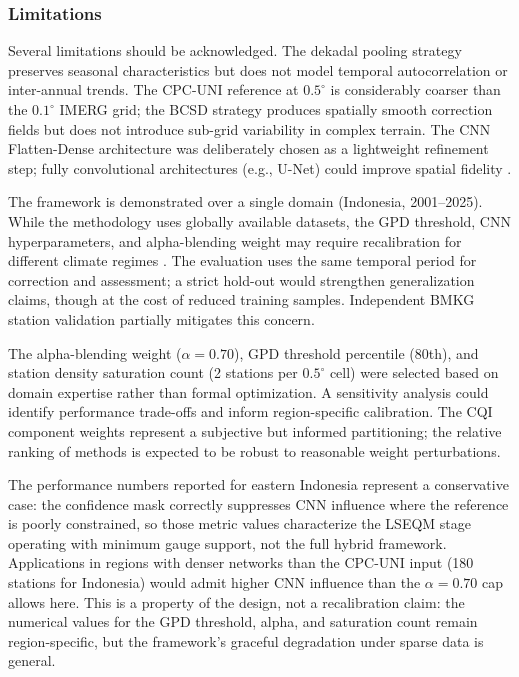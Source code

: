 \documentclass[11pt,a4paper]{article}
\begin{document}
\subsubsection{Limitations}\label{limitations}

Several limitations should be acknowledged. The dekadal pooling strategy preserves seasonal characteristics but does not model temporal autocorrelation or inter-annual trends. The CPC-UNI reference at \(0.5^{\circ}\) is considerably coarser than the \(0.1^{\circ}\) IMERG grid; the BCSD strategy produces spatially smooth correction fields but does not introduce sub-grid variability in complex terrain. The CNN Flatten-Dense architecture was deliberately chosen as a lightweight refinement step; fully convolutional architectures (e.g., U-Net) could improve spatial fidelity \cite{ref40,ref41}.

The framework is demonstrated over a single domain (Indonesia, 2001--2025). While the methodology uses globally available datasets, the GPD threshold, CNN hyperparameters, and alpha-blending weight may require recalibration for different climate regimes \cite{ref44,ref45}. The evaluation uses the same temporal period for correction and assessment; a strict hold-out would strengthen generalization claims, though at the cost of reduced training samples. Independent BMKG station validation partially mitigates this concern.

The alpha-blending weight (\(\alpha = 0.70\)), GPD threshold percentile (80th), and station density saturation count (2 stations per \(0.5^{\circ}\) cell) were selected based on domain expertise rather than formal optimization. A sensitivity analysis could identify performance trade-offs and inform region-specific calibration. The CQI component weights represent a subjective but informed partitioning; the relative ranking of methods is expected to be robust to reasonable weight perturbations.

The performance numbers reported for eastern Indonesia represent a conservative case: the confidence mask correctly suppresses CNN influence where the reference is poorly constrained, so those metric values characterize the LSEQM stage operating with minimum gauge support, not the full hybrid framework. Applications in regions with denser networks than the CPC-UNI input (180 stations for Indonesia) would admit higher CNN influence than the \(\alpha = 0.70\) cap allows here. This is a property of the design, not a recalibration claim: the numerical values for the GPD threshold, alpha, and saturation count remain region-specific, but the framework's graceful degradation under sparse data is general.
\end{document}
